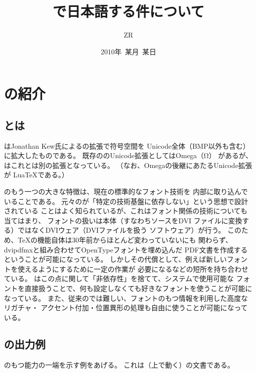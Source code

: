\documentclass[a4paper]{bxjsarticle}
\begin{document}
\title{{\XeLaTeX}で日本語する件について}
\author{ZR}
\date{2010年\ 某月\ 某日}
\maketitle

\section{{\XeTeX}\>の紹介}

\subsection{{\XeTeX}\>とは}

{\XeTeX}\>はJonathan Kew氏による\>{\TeX}\>の拡張で符号空間を
Unicode全体（BMP以外も含む）に拡大したものである。
既存の\>{\TeX}\>のUnicode拡張としてはOmega（Ω）
があるが、{\XeTeX}\>はこれとは別の拡張となっている。%
（なお、Omegaの後継にあたるUnicode拡張\>{\TeX}\>が\>%
{Lua\TeX}\>である。）

{\XeTeX}\>のもう一つの大きな特徴は、現在の標準的なフォント技術を
内部に取り込んでいることである。
元々の\>{\TeX}\>が「特定の技術基盤に依存しない」という思想で設計されている
ことはよく知られているが、これはフォント関係の技術についても当てはまり、
フォントの扱いは\>{\TeX}\>本体（すなわち\>{\TeX}\>ソースをDVI%
ファイルに変換する）ではなくDVIウェア（DVIファイルを扱う
ソフトウェア）が行う。
このため、{\TeX}\>の機能自体は30年前からほとんど変わっていないにも
関わらず、dvipdfmxと組み合わせてOpenTypeフォントを埋め込んだ%
PDF文書を作成するということが可能になっている。
しかしその代償として、例えば新しいフォントを使えるようにするために一定の作業が
必要になるなどの短所を持ち合わせている。
{\XeTeX}\>はこの点に関して「非依存性」を捨てて、システムで使用可能な
フォントを直接扱うことで、何も設定しなくても好きなフォントを使うことが可能に
なっている。
また、従来の\>{\TeX}\>では難しい、フォントのもつ情報を利用した高度なリガチャ・
アクセント付加・位置異形の処理も自由に使うことが可能になっている。

\subsection{{\XeTeX}\>の出力例}

{\XeTeX}\>のもつ能力の一端を示す例をあげる。
これは\>{\XeLaTeX}（{\XeTeX}\>上で動く\>{\LaTeX}）の文書である。
\end{document}
